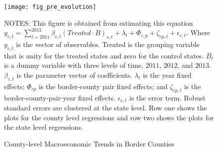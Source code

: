 \begin{figure}[H]
    \centering
    \texttt{[image: fig\_pre\_evolution]}
    \caption{County-level Macroeconomic Trends in Border Counties}
    \label{fig:county-level-macroeconomic-trends-in-border-counties}
    \begin{minipage}{18cm}
        \vspace{0.05in}
        {NOTES: This figure is obtained from estimating this equation $y_{c,t} = \sum_{t = 2011}^{2013} \beta_{c,t} (Treated \cdot B)_{s,t} + \lambda_{t} + \Phi_{c,p} + \zeta_{cp,t} + \epsilon_{c,t}$. Where $y_{c,t}$ is the vector of observables. Treated is the grouping variable that is unity for the treated states and zero for the control states. $B_{t}$ is a dummy variable with three levels of time, $2011$, $2012$, and $2013$. $\beta_{c,t}$ is the parameter vector of coefficients. $\lambda_{t}$ is the year fixed effects; $\Phi_{cp}$ is the border-county pair fixed effects; and $\zeta_{cp,t}$ is the border-county-pair-year fixed effects. $\epsilon_{c,t}$ is the error term. Robust standard errors are clustered at the state level. Row one shows the plots for the county level regressions and row two shows the plots for the state level regressions. \par}
    \end{minipage}
\end{figure}
